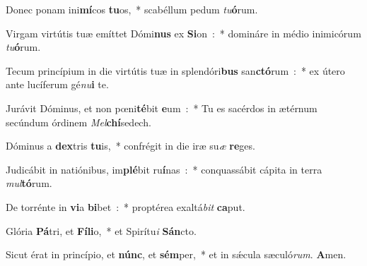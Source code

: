 ﻿\item Donec ponam ini\textbf{mí}cos \textbf{tu}os,~* scabéllum pedum \emph{tu}\-\textbf{ó}\-rum.
\item Virgam virtútis tuæ emíttet Dómi\textbf{nus} ex \textbf{Si}on~:~* domináre in médio inimicórum \emph{tu}\textbf{ó}rum.
\item Tecum princípium in die virtútis tuæ in splen\-dó\-ri\-\textbf{bus} san\textbf{ctó}rum~:~* ex útero ante lucíferum gé\emph{nu}\textbf{i} te.
\item Jurávit Dóminus, et non pœni\textbf{té}bit \textbf{e}um~:~* Tu es sacérdos in ætérnum secúndum órdinem \emph{Mel}\textbf{chí}sedech.
\item Dóminus a \textbf{dex}tris \textbf{tu}is,~* confrégit in die iræ su\emph{æ} \textbf{re}\-ges.
\item Judicábit in natiónibus, im\textbf{plé}bit ru\textbf{í}nas~:~* conquassábit cápita in terra \emph{mul}\textbf{tó}rum.
\item De torrénte in \textbf{vi}a \textbf{bi}bet~:~* proptérea exaltá\emph{bit} \textbf{ca}\-put.
\item Glória \textbf{Pá}tri, et \textbf{Fí}\textbf{li}o,~* et Spirítu\emph{i} \textbf{Sán}cto.
\item Sicut érat in princípio, et \textbf{núnc}, et \textbf{sém}per,~* et in sǽcula sæculó\emph{rum}. \textbf{A}men.